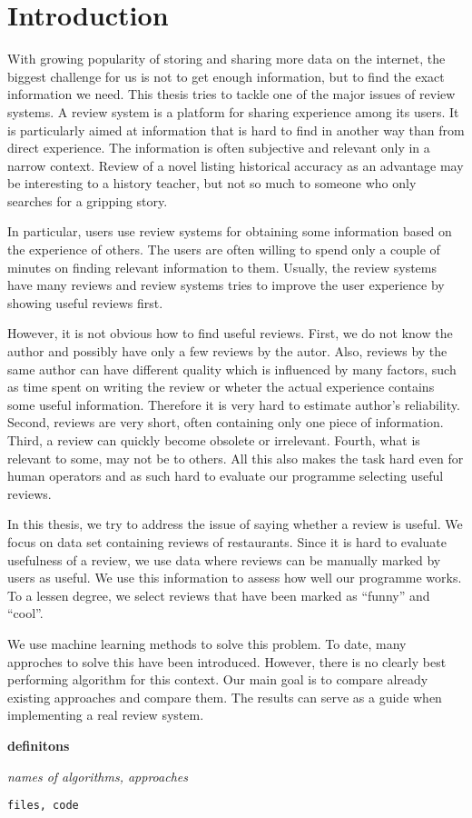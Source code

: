 \chapter*{Introduction}

With growing popularity of storing and sharing more data on the internet, the biggest challenge
for us is not to get enough information, but to find the exact information we need.
This thesis tries to tackle one of the major issues of review systems.
A review system is a platform for sharing experience among its users.
It is particularly aimed at information that is hard to find in another way than from direct experience.
The information is often subjective and relevant only in a narrow context.
Review of a novel listing historical accuracy as an advantage may be interesting to a history teacher,
but not so much to someone who only searches for a gripping story.

In particular, users use review systems for obtaining some information based on the experience of others.
The users are often willing to spend only a couple of minutes on finding relevant information to them.
Usually, the review systems have many reviews and review systems tries to improve the user experience by showing useful reviews first.

However, it is not obvious how to find useful reviews.
First, we do not know the author and possibly have only a few reviews by the autor.
Also, reviews by the same author can have different quality which is influenced by many factors,
such as time spent on writing the review or wheter the actual experience contains some useful information.
Therefore it is very hard to estimate author's reliability.
Second, reviews are very short, often containing only one piece of information.
Third, a review can quickly become obsolete or irrelevant.
Fourth, what is relevant to some, may not be to others.
All this also makes the task hard even for human operators and as such hard to evaluate our programme selecting useful reviews.

In this thesis, we try to address the issue of saying whether a review is useful.
We focus on data set containing reviews of restaurants.
Since it is hard to evaluate usefulness of a review, we use data where reviews can be manually marked by users as useful.
We use this information to assess how well our programme works.
To a lessen degree, we select reviews that have been marked as ``funny'' and ``cool''.

We use machine learning methods to solve this problem.
To date, many approches to solve this have been introduced.
However, there is no clearly best performing algorithm for this context.
Our main goal is to compare already existing approaches and compare them.
The results can serve as a guide when implementing a real review system.





{\bf definitons}

{\it names of algorithms, approaches}

\texttt{files, code}


